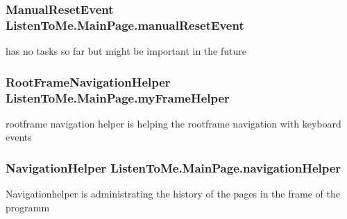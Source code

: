 \subsubsection[{\texorpdfstring{manual\+Reset\+Event}{manualResetEvent}}]{\setlength{\rightskip}{0pt plus 5cm}Manual\+Reset\+Event Listen\+To\+Me.\+Main\+Page.\+manual\+Reset\+Event\hspace{0.3cm}{\ttfamily [private]}}\hypertarget{class_listen_to_me_1_1_main_page_acc2116e019bacfa54fd25381eeaf363f}{}\label{class_listen_to_me_1_1_main_page_acc2116e019bacfa54fd25381eeaf363f}


has no tasks so far but might be important in the future 

\subsubsection[{\texorpdfstring{my\+Frame\+Helper}{myFrameHelper}}]{\setlength{\rightskip}{0pt plus 5cm}Root\+Frame\+Navigation\+Helper Listen\+To\+Me.\+Main\+Page.\+my\+Frame\+Helper\hspace{0.3cm}{\ttfamily [private]}}\hypertarget{class_listen_to_me_1_1_main_page_a3185b88ec21f447708a2d3da983997e0}{}\label{class_listen_to_me_1_1_main_page_a3185b88ec21f447708a2d3da983997e0}


rootframe navigation helper is helping the rootframe navigation with keyboard events 

\subsubsection[{\texorpdfstring{navigation\+Helper}{navigationHelper}}]{\setlength{\rightskip}{0pt plus 5cm}Navigation\+Helper Listen\+To\+Me.\+Main\+Page.\+navigation\+Helper\hspace{0.3cm}{\ttfamily [private]}}\hypertarget{class_listen_to_me_1_1_main_page_a9ad9fdc2f7159cbe2d495645459cffe8}{}\label{class_listen_to_me_1_1_main_page_a9ad9fdc2f7159cbe2d495645459cffe8}


Navigationhelper is administrating the history of the pages in the frame of the programm 

